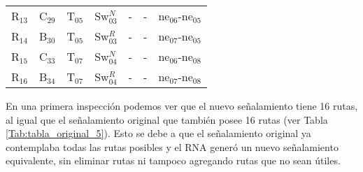 \begin{table}[!h]
{{\begin{tabular}{ c c c c c c c }
                    R$_{13}$  & C$_{29}$ & T$_{05}$ & Sw$_{03}^{N}$ & - & - & ne$_{06}$-ne$_{05}$\\
                    R$_{14}$  & B$_{30}$ & T$_{05}$ & Sw$_{03}^{R}$ & - & - & ne$_{07}$-ne$_{05}$\\
                    R$_{15}$  & C$_{33}$ & T$_{07}$ & Sw$_{04}^{N}$ & - & - & ne$_{06}$-ne$_{08}$\\
                    R$_{16}$  & B$_{34}$ & T$_{07}$ & Sw$_{04}^{R}$ & - & - & ne$_{07}$-ne$_{08}$\\
                \hline
            \end{tabular}
        }
     }
    \end{table}
    
    En una primera inspección podemos ver que el nuevo señalamiento tiene 16 rutas, al igual que el señalamiento original que también posee 16 rutas (ver Tabla \ref{Tab:tabla_original_5}). Esto se debe a que el señalamiento original ya contemplaba todas las rutas posibles y el RNA generó un nuevo señalamiento equivalente, sin eliminar rutas ni tampoco agregando rutas que no sean útiles.